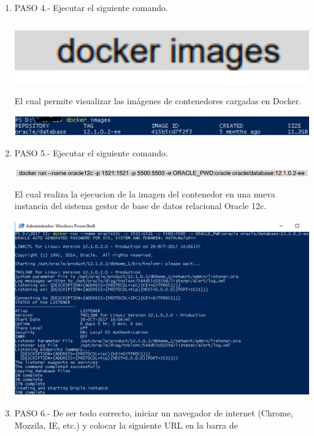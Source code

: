 \documentclass[12pt,letterpaper]{article}
\begin{document}
\begin{enumerate}[1.]
\item PASO 4.- Ejecutar el siguiente comando.
 \\
 \begin{center}
\includegraphics[width=15cm]{./IMAGENES/img12}
\end{center} 

El cual permite visualizar las imágenes de contenedores cargadas en Docker.
\begin{center}
\includegraphics[width=15cm]{./IMAGENES/img6}
\end{center} 
\item PASO 5.- Ejecutar el siguiente comando.
 \\
\begin{center}
\includegraphics[width=15cm]{./IMAGENES/img13}
\end{center} 
El cual realiza la ejecucion de la imagen del contenedor en una nueva instancia del sistema gestor de base de
datos relacional Oracle 12c.
\begin{center}
\includegraphics[width=15cm]{./IMAGENES/img7}
\end{center} 
\item PASO 6.- De ser todo correcto, iniciar un navegador de internet (Chrome, Mozzila, IE, etc.) y colocar la siguiente URL en la barra de

\end{enumerate}
\end{document}
